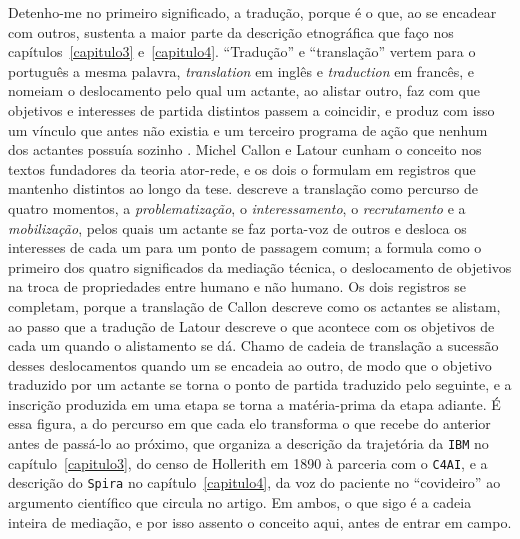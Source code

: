 Detenho-me no primeiro significado, a tradução, porque é o que, ao se encadear com outros, sustenta a maior parte da descrição etnográfica que faço nos capítulos~\ref{capitulo3} e~\ref{capitulo4}. \enquote{Tradução} e \enquote{translação} vertem para o português a mesma palavra, \textit{translation} em inglês e \textit{traduction} em francês, e nomeiam o deslocamento pelo qual um actante, ao alistar outro, faz com que objetivos e interesses de partida distintos passem a coincidir, e produz com isso um vínculo que antes não existia e um terceiro programa de ação que nenhum dos actantes possuía sozinho \parencite{Latour2017Esperanca}. Michel Callon e Latour cunham o conceito nos textos fundadores da teoria ator-rede, e os dois o formulam em registros que mantenho distintos ao longo da tese. \textcite{Callon1986Sociology} descreve a translação como percurso de quatro momentos, a \textit{problematização}, o \textit{interessamento}, o \textit{recrutamento} e a \textit{mobilização}, pelos quais um actante se faz porta-voz de outros e desloca os interesses de cada um para um ponto de passagem comum; \textcite{Latour2017Esperanca} a formula como o primeiro dos quatro significados da mediação técnica, o deslocamento de objetivos na troca de propriedades entre humano e não humano. Os dois registros se completam, porque a translação de Callon descreve como os actantes se alistam, ao passo que a tradução de Latour descreve o que acontece com os objetivos de cada um quando o alistamento se dá. Chamo de cadeia de translação a sucessão desses deslocamentos quando um se encadeia ao outro, de modo que o objetivo traduzido por um actante se torna o ponto de partida traduzido pelo seguinte, e a inscrição produzida em uma etapa se torna a matéria-prima da etapa adiante. É essa figura, a do percurso em que cada elo transforma o que recebe do anterior antes de passá-lo ao próximo, que organiza a descrição da trajetória da \texttt{IBM} no capítulo~\ref{capitulo3}, do censo de Hollerith em 1890 à parceria com o \texttt{C4AI}, e a descrição do \texttt{Spira} no capítulo~\ref{capitulo4}, da voz do paciente no \enquote{covideiro} ao argumento científico que circula no artigo. Em ambos, o que sigo é a cadeia inteira de mediação, e por isso assento o conceito aqui, antes de entrar em campo.

